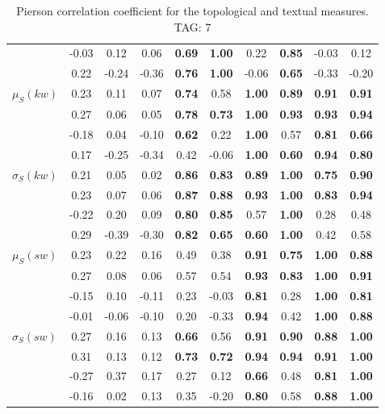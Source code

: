 \begin{table*}[h!]
\begin{center}
\begin{tabular}{| l || c | c | c | c | c | c | c | c | c |}
 & -0.03 & 0.12 & 0.06 & {\bf 0.69} & {\bf 1.00} & 0.22 & {\bf 0.85} & -0.03 & 0.12 \\
 & 0.22 & -0.24 & -0.36 & {\bf 0.76} & {\bf 1.00} & -0.06 & {\bf 0.65} & -0.33 & -0.20 \\\hline
$\mu_S(kw)$ & 0.23 & 0.11 & 0.07 & {\bf 0.74} & 0.58 & {\bf 1.00} & {\bf 0.89} & {\bf 0.91} & {\bf 0.91} \\
 & 0.27 & 0.06 & 0.05 & {\bf 0.78} & {\bf 0.73} & {\bf 1.00} & {\bf 0.93} & {\bf 0.93} & {\bf 0.94} \\
 & -0.18 & 0.04 & -0.10 & {\bf 0.62} & 0.22 & {\bf 1.00} & 0.57 & {\bf 0.81} & {\bf 0.66} \\
 & 0.17 & -0.25 & -0.34 & 0.42 & -0.06 & {\bf 1.00} & {\bf 0.60} & {\bf 0.94} & {\bf 0.80} \\\hline
$\sigma_S(kw)$ & 0.21 & 0.05 & 0.02 & {\bf 0.86} & {\bf 0.83} & {\bf 0.89} & {\bf 1.00} & {\bf 0.75} & {\bf 0.90} \\
 & 0.23 & 0.07 & 0.06 & {\bf 0.87} & {\bf 0.88} & {\bf 0.93} & {\bf 1.00} & {\bf 0.83} & {\bf 0.94} \\
 & -0.22 & 0.20 & 0.09 & {\bf 0.80} & {\bf 0.85} & 0.57 & {\bf 1.00} & 0.28 & 0.48 \\
 & 0.29 & -0.39 & -0.30 & {\bf 0.82} & {\bf 0.65} & {\bf 0.60} & {\bf 1.00} & 0.42 & 0.58 \\\hline
$\mu_S(sw)$ & 0.23 & 0.22 & 0.16 & 0.49 & 0.38 & {\bf 0.91} & {\bf 0.75} & {\bf 1.00} & {\bf 0.88} \\
 & 0.27 & 0.08 & 0.06 & 0.57 & 0.54 & {\bf 0.93} & {\bf 0.83} & {\bf 1.00} & {\bf 0.91} \\
 & -0.15 & 0.10 & -0.11 & 0.23 & -0.03 & {\bf 0.81} & 0.28 & {\bf 1.00} & {\bf 0.81} \\
 & -0.01 & -0.06 & -0.10 & 0.20 & -0.33 & {\bf 0.94} & 0.42 & {\bf 1.00} & {\bf 0.88} \\\hline
$\sigma_S(sw)$ & 0.27 & 0.16 & 0.13 & {\bf 0.66} & 0.56 & {\bf 0.91} & {\bf 0.90} & {\bf 0.88} & {\bf 1.00} \\
 & 0.31 & 0.13 & 0.12 & {\bf 0.73} & {\bf 0.72} & {\bf 0.94} & {\bf 0.94} & {\bf 0.91} & {\bf 1.00} \\
 & -0.27 & 0.37 & 0.17 & 0.27 & 0.12 & {\bf 0.66} & 0.48 & {\bf 0.81} & {\bf 1.00} \\
 & -0.16 & 0.02 & 0.13 & 0.35 & -0.20 & {\bf 0.80} & 0.58 & {\bf 0.88} & {\bf 1.00} \\\hline
\end{tabular}
\caption{Pierson correlation coefficient for the topological and textual measures. TAG: 7}
\end{center}
\end{table*}